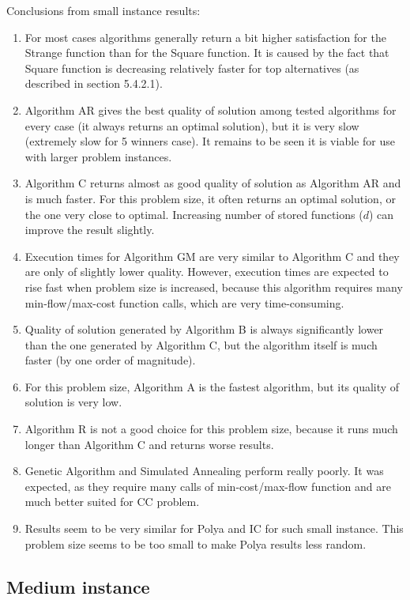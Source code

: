Conclusions from small instance results:
\begin{enumerate}
	\item For most cases algorithms generally return a bit higher satisfaction for the Strange function than for the Square function. It is caused by the fact that Square function is decreasing relatively faster for top alternatives (as described in section 5.4.2.1).
	\item Algorithm AR gives the best quality of solution among tested algorithms for every case (it always returns an optimal solution), but it is very slow (extremely slow for 5 winners case). It remains to be seen it is viable for use with larger problem instances.
	\item Algorithm C returns almost as good quality of solution as Algorithm AR and is much faster. For this problem size, it often returns an optimal solution, or the one very close to optimal. Increasing number of stored functions ($d$) can improve the result slightly.
	\item Execution times for Algorithm GM are very similar to Algorithm C and they are only of slightly lower quality. However, execution times are expected to rise fast when problem size is increased, because this algorithm requires many min-flow/max-cost function calls, which are very time-consuming.
	\item Quality of solution generated by Algorithm B is always significantly lower than the one generated by Algorithm C, but the algorithm itself is much faster (by one order of magnitude).
	\item For this problem size, Algorithm A is the fastest algorithm, but its quality of solution is very low.
	\item Algorithm R is not a good choice for this problem size, because it runs much longer than Algorithm C and returns worse results.
	\item Genetic Algorithm and Simulated Annealing perform really poorly. It was expected, as they require many calls of min-cost/max-flow function and are much better suited for CC problem.
	\item Results seem to be very similar for Polya and IC for such small instance. This problem size seems to be too small to make Polya results less random.
\end{enumerate}

\subsection{Medium instance}

